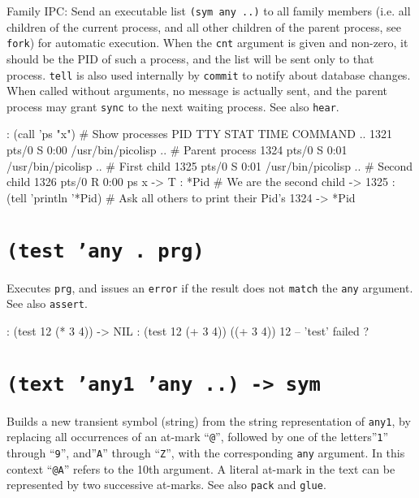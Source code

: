 Family IPC: Send an executable list \texttt{(sym any ..)} to all family members
(i.e. all children of the current process, and all other children of the
parent process, see \texttt{fork}) for automatic execution. When the \texttt{cnt}
argument is given and non-zero, it should be the PID of such a process,
and the list will be sent only to that process. \texttt{tell} is also used
internally by \texttt{commit} to notify about database changes. When called
without arguments, no message is actually sent, and the parent process
may grant \texttt{sync} to the next waiting process. See also \texttt{hear}.


\begin{wideverbatim}
: (call 'ps "x")                          # Show processes
  PID TTY      STAT   TIME COMMAND
  ..
 1321 pts/0    S      0:00 /usr/bin/picolisp ..  # Parent process
 1324 pts/0    S      0:01 /usr/bin/picolisp ..  # First child
 1325 pts/0    S      0:01 /usr/bin/picolisp ..  # Second child
 1326 pts/0    R      0:00 ps x
-> T
: *Pid                                    # We are the second child
-> 1325
: (tell 'println '*Pid)                   # Ask all others to print their Pid's
1324
-> *Pid
\end{wideverbatim}

 
\section*{\texttt{(test 'any . prg)}}
\label{sec:func-ref-T-(test 'any . prg)}


Executes \texttt{prg}, and issues an \texttt{error} if the result does not \texttt{match} the
\texttt{any} argument. See also \texttt{assert}.


\begin{wideverbatim}
: (test 12 (* 3 4))
-> NIL
: (test 12 (+ 3 4))
((+ 3 4))
12 -- 'test' failed
?
\end{wideverbatim}

 
\section*{\texttt{(text 'any1 'any ..) -> sym}}
\label{sec:func-ref-T-(text 'any1 'any ..) -> sym}


Builds a new transient symbol (string) from the string representation of
\texttt{any1}, by replacing all occurrences of an at-mark ``\texttt{@}'', followed by
one of the letters''\texttt{1}'' through ``\texttt{9}'', and''\texttt{A}'' through ``\texttt{Z}'', with the
corresponding \texttt{any} argument. In this context ``\texttt{@A}'' refers to the 10th
argument. A literal at-mark in the text can be represented by two
successive at-marks. See also \texttt{pack} and \texttt{glue}.


